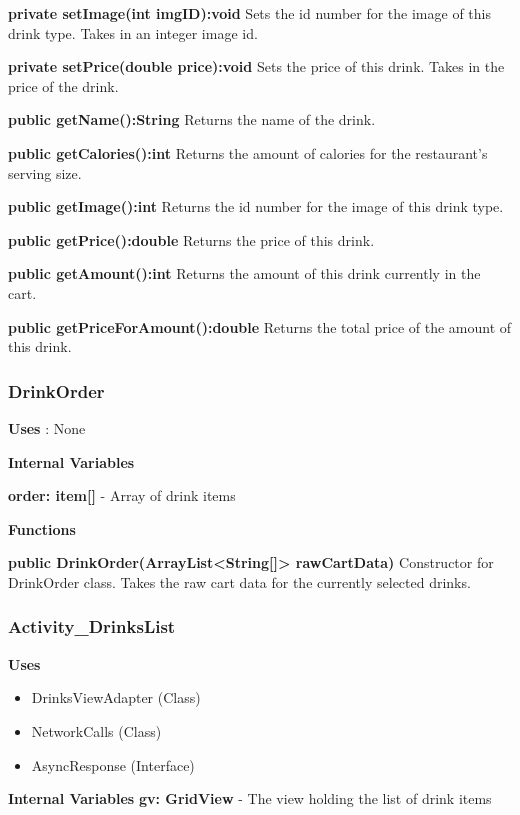 \documentclass [10pt]{article}
\begin{document}
\textbf{private setImage(int imgID):void}
Sets the id number for the image of this drink type. Takes in an integer image id.

\textbf{private setPrice(double price):void}
Sets the price of this drink. Takes in the price of the drink.

\textbf{public getName():String}
Returns the name of the drink.

\textbf{public getCalories():int}
Returns the amount of calories for the restaurant's serving size.

\textbf{public getImage():int}
Returns the id number for the image of this drink type.

\textbf{public getPrice():double}
Returns the price of this drink.

\textbf{public getAmount():int}
Returns the amount of this drink currently in the cart.

\textbf{public getPriceForAmount():double}
Returns the total price of the amount of this drink.

\subsubsection{DrinkOrder}
\textbf{Uses} : None

\textbf{Internal Variables}

\textbf{order: item[]} - Array of drink items

\textbf{Functions}

\textbf{public DrinkOrder(ArrayList<String[]> rawCartData)}
Constructor for DrinkOrder class. Takes the raw cart data for the currently selected drinks.


\subsubsection{Activity\_DrinksList}

\textbf{Uses}

\begin{itemize}
	\item DrinksViewAdapter (Class)
	\item NetworkCalls (Class)
	\item AsyncResponse (Interface)
\end{itemize}

\textbf{Internal Variables}
\textbf{gv: GridView} - The view holding the list of drink items
\end{document}
